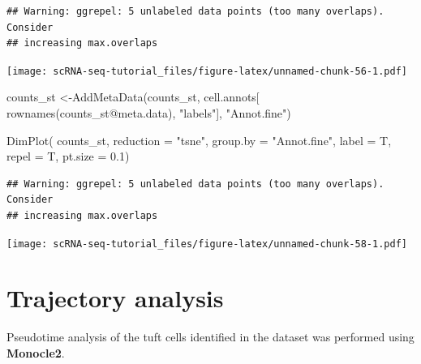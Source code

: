 \documentclass[
]{book}
\newenvironment{Shaded}{\begin{snugshade}}{\end{snugshade}}
\newcommand{\AttributeTok}[1]{\textcolor[rgb]{0.77,0.63,0.00}{#1}}
\newcommand{\FloatTok}[1]{\textcolor[rgb]{0.00,0.00,0.81}{#1}}
\newcommand{\FunctionTok}[1]{\textcolor[rgb]{0.00,0.00,0.00}{#1}}
\newcommand{\NormalTok}[1]{#1}
\newcommand{\OtherTok}[1]{\textcolor[rgb]{0.56,0.35,0.01}{#1}}
\newcommand{\SpecialCharTok}[1]{\textcolor[rgb]{0.00,0.00,0.00}{#1}}
\newcommand{\StringTok}[1]{\textcolor[rgb]{0.31,0.60,0.02}{#1}}
\begin{document}
\begin{verbatim}
## Warning: ggrepel: 5 unlabeled data points (too many overlaps). Consider
## increasing max.overlaps
\end{verbatim}

\texttt{[image: scRNA-seq-tutorial\_files/figure-latex/unnamed-chunk-56-1.pdf]}

\begin{Shaded}
\begin{Highlighting}[]
\NormalTok{counts\_st }\OtherTok{\textless{}{-}}\FunctionTok{AddMetaData}\NormalTok{(counts\_st, cell.annots[}
  \FunctionTok{rownames}\NormalTok{(counts\_st}\SpecialCharTok{@}\NormalTok{meta.data), }\StringTok{"labels"}\NormalTok{], }\StringTok{"Annot.fine"}\NormalTok{)}
\end{Highlighting}
\end{Shaded}

\begin{Shaded}
\begin{Highlighting}[]
\FunctionTok{DimPlot}\NormalTok{(}
\NormalTok{    counts\_st,}
    \AttributeTok{reduction =} \StringTok{"tsne"}\NormalTok{,}
    \AttributeTok{group.by =} \StringTok{"Annot.fine"}\NormalTok{,}
    \AttributeTok{label =}\NormalTok{ T,}
    \AttributeTok{repel =}\NormalTok{ T,}
    \AttributeTok{pt.size =} \FloatTok{0.1}\NormalTok{)}
\end{Highlighting}
\end{Shaded}

\begin{verbatim}
## Warning: ggrepel: 5 unlabeled data points (too many overlaps). Consider
## increasing max.overlaps
\end{verbatim}

\texttt{[image: scRNA-seq-tutorial\_files/figure-latex/unnamed-chunk-58-1.pdf]}

\hypertarget{trajectory-analysis}{%
\section{Trajectory analysis}\label{trajectory-analysis}}

Pseudotime analysis of the tuft cells identified in the dataset was performed using \textbf{Monocle2}.
\end{document}
